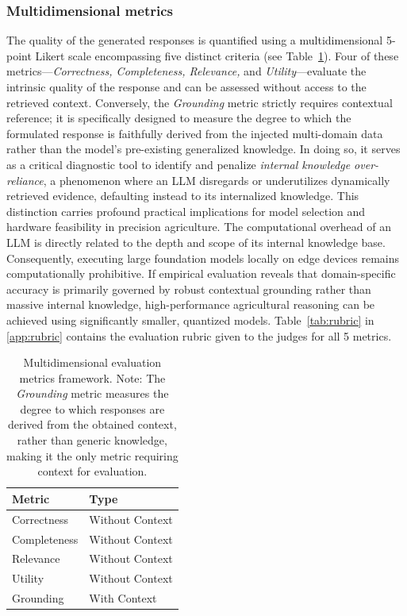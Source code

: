 \documentclass[preprint,review,12pt,authoryear]{elsarticle}
\newcommand{\tabfont}{\scriptsize}
\begin{document}
\subsubsection{Multidimensional metrics}

The quality of the generated responses is quantified using a multidimensional 5-point Likert scale encompassing five distinct criteria (see Table~\ref{tab:evaluation_metrics}). Four of these metrics—\textit{Correctness, Completeness, Relevance,} and \textit{Utility}—evaluate the intrinsic quality of the response and can be assessed without access to the retrieved context. Conversely, the \textit{Grounding} metric strictly requires contextual reference; it is specifically designed to measure the degree to which the formulated response is faithfully derived from the injected multi-domain data rather than the model's pre-existing generalized knowledge. In doing so, it serves as a critical diagnostic tool to identify and penalize \textit{internal knowledge over-reliance}, a phenomenon where an LLM disregards or underutilizes dynamically retrieved evidence, defaulting instead to its internalized knowledge. This distinction carries profound practical implications for model selection and hardware feasibility in precision agriculture. The computational overhead of an LLM is directly related to the depth and scope of its internal knowledge base. Consequently, executing large foundation models locally on edge devices remains computationally prohibitive. If empirical evaluation reveals that domain-specific accuracy is primarily governed by robust contextual grounding rather than massive internal knowledge, high-performance agricultural reasoning can be achieved using significantly smaller, quantized models. Table~\ref{tab:rubric} in \ref{app:rubric} contains the evaluation rubric given to the judges for all 5 metrics.

\begin{table}[h!]
	\caption{Multidimensional evaluation metrics framework. Note: The \textit{Grounding} metric measures the degree to which responses are derived from the obtained context, rather than generic knowledge, making it the only metric requiring context for evaluation.}
	\label{tab:evaluation_metrics}
	\tabfont
	\begin{tabular}{
			>{\raggedright\arraybackslash}p{}
			>{\raggedright\arraybackslash}p{}
		}
		\hline
		\textbf{Metric} & \textbf{Type}   \\
		\hline
		Correctness     & Without Context \\
		Completeness    & Without Context \\
		Relevance       & Without Context \\
		Utility         & Without Context \\
		\hline
		Grounding       & With Context    \\
		\hline
	\end{tabular}
\end{table}
\end{document}
